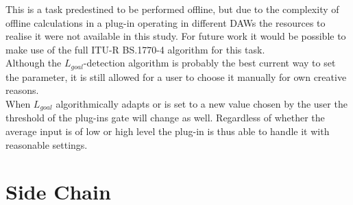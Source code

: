 This is a task predestined to be performed offline, but due to the complexity of offline calculations in a plug-in operating in different DAWs the resources to realise it were not available in this study. For future work it would be possible to make use of the full ITU-R BS.1770-4\cite{ITUalgo} algorithm for this task.\\
Although the $L_{goal}$-detection algorithm is probably the best current way to set the parameter, it is still allowed for a user to choose it manually for own creative reasons.\\
When $L_{goal}$ algorithmically adapts or is set to a new value chosen by the user the threshold of the plug-ins gate will change as well. Regardless of whether the average input is of low or high level the plug-in is thus able to handle it with reasonable settings.\\

\section{Side Chain}

